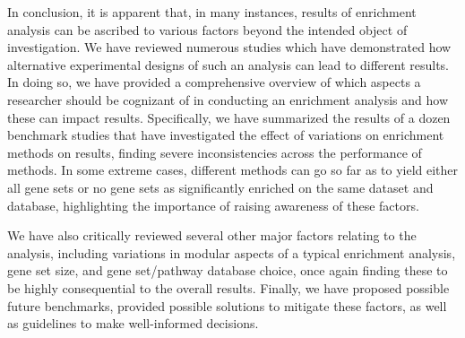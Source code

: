 In conclusion, it is apparent that, in many instances, results of enrichment analysis can be ascribed to various factors beyond the intended object of investigation. We have reviewed numerous studies which have demonstrated how alternative experimental designs of such an analysis can lead to different results. In doing so, we have provided a comprehensive overview of which aspects a researcher should be cognizant of in conducting an enrichment analysis and how these can impact results. Specifically, we have summarized the results of a dozen benchmark studies that have investigated the effect of variations on enrichment methods on results, finding severe inconsistencies across the performance of methods. In some extreme cases, different methods can go so far as to yield either all gene sets or no gene sets as significantly enriched on the same dataset and database, highlighting the importance of raising awareness of these factors. 

We have also critically reviewed several other major factors relating to the analysis, including variations in modular aspects of a typical enrichment analysis, gene set size, and gene set/pathway database choice, once again finding these to be highly consequential to the overall results. Finally, we have proposed possible future benchmarks, provided possible solutions to mitigate these factors, as well as guidelines to make well-informed decisions. 
